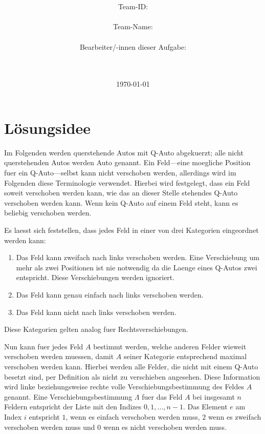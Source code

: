 \documentclass[a4paper,10pt,ngerman]{scrartcl}
\title{\textbf{\Huge\Aufgabe}}
\author{\LARGE Team-ID: \LARGE \TeamId \\\\
	    \LARGE Team-Name: \LARGE \TeamName \\\\
	    \LARGE Bearbeiter/-innen dieser Aufgabe: \\ 
	    \LARGE \Namen\\\\}
\date{\LARGE\today}
\begin{document}
\maketitle
\tableofcontents

\vspace{0.5cm}

\section{Lösungsidee}
Im Folgenden werden querstehende Autos mit \glqq{}Q-Auto\grqq{} abgekuerzt; alle nicht querstehenden Autos werden \glqq{}Auto\grqq{} genannt.
Ein Feld---eine moegliche Position fuer ein Q-Auto---selbst kann nicht verschoben werden, allerdings wird im Folgenden diese Terminologie verwendet.
Hierbei wird festgelegt, dass ein Feld soweit verschoben werden kann, wie das an dieser Stelle stehendes Q-Auto verschoben werden kann.
Wenn kein Q-Auto auf einem Feld steht, kann es beliebig verschoben werden.

Es laesst sich feststellen, dass jedes Feld in einer von drei Kategorien eingeordnet werden kann:
\begin{enumerate}
    \item Das Feld kann zweifach nach links verschoben werden.
          Eine Verschiebung um mehr als zwei Positionen ist nie notwendig da die Laenge eines Q-Autos zwei entspricht.
          Diese Verschiebungen werden ignoriert.
    \item Das Feld kann genau einfach nach links verschoben werden.
    \item Das Feld kann nicht nach links verschoben werden.
\end{enumerate}
Diese Kategorien gelten analog fuer Rechtsverschiebungen.

Nun kann fuer jedes Feld $A$ bestimmt werden, welche anderen Felder wieweit verschoben werden muessen, damit $A$ seiner Kategorie entsprechend maximal verschoben werden kann.
Hierbei werden alle Felder, die nicht mit einem Q-Auto besetzt sind, per Definition als nicht zu verschieben angesehen.
Diese Information wird linke beziehungsweise rechte volle Verschiebungsbestimmung des Feldes $A$ genannt.
Eine Verschiebungsbestimmung $\Lambda$ fuer das Feld $A$ bei insgesamt $n$ Feldern entspricht der Liste mit den Indizes $0,1,\dots,n-1$.
Das Element $e$ am Index $i$ entspricht $1$, wenn es einfach verschoben werden muss, $2$ wenn es zweifach verschoben werden muss und $0$ wenn es nicht verschoben werden muss.
\end{document}
